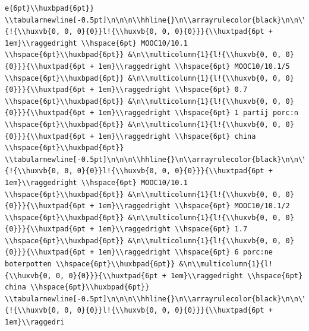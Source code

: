 \documentclass[11pt,preprint, authoryear]{elsarticle}
\numberwithin{equation}{section}
\numberwithin{figure}{section}
\numberwithin{table}{section}
\begin{document}
\begin{verbatim}
e{6pt}\\huxbpad{6pt}} \\tabularnewline[-0.5pt]\n\n\n\\hhline{}\n\\arrayrulecolor{black}\n\n\\multicolumn{1}{!{\\huxvb{0, 0, 0}{0}}l!{\\huxvb{0, 0, 0}{0}}}{\\huxtpad{6pt + 1em}\\raggedright \\hspace{6pt} MOOC10/10.1 \\hspace{6pt}\\huxbpad{6pt}} &\n\\multicolumn{1}{l!{\\huxvb{0, 0, 0}{0}}}{\\huxtpad{6pt + 1em}\\raggedright \\hspace{6pt} MOOC10/10.1/5 \\hspace{6pt}\\huxbpad{6pt}} &\n\\multicolumn{1}{l!{\\huxvb{0, 0, 0}{0}}}{\\huxtpad{6pt + 1em}\\raggedright \\hspace{6pt} 0.7 \\hspace{6pt}\\huxbpad{6pt}} &\n\\multicolumn{1}{l!{\\huxvb{0, 0, 0}{0}}}{\\huxtpad{6pt + 1em}\\raggedright \\hspace{6pt} 1 partij porc:n \\hspace{6pt}\\huxbpad{6pt}} &\n\\multicolumn{1}{l!{\\huxvb{0, 0, 0}{0}}}{\\huxtpad{6pt + 1em}\\raggedright \\hspace{6pt} china \\hspace{6pt}\\huxbpad{6pt}} \\tabularnewline[-0.5pt]\n\n\n\\hhline{}\n\\arrayrulecolor{black}\n\n\\multicolumn{1}{!{\\huxvb{0, 0, 0}{0}}l!{\\huxvb{0, 0, 0}{0}}}{\\huxtpad{6pt + 1em}\\raggedright \\hspace{6pt} MOOC10/10.1 \\hspace{6pt}\\huxbpad{6pt}} &\n\\multicolumn{1}{l!{\\huxvb{0, 0, 0}{0}}}{\\huxtpad{6pt + 1em}\\raggedright \\hspace{6pt} MOOC10/10.1/2 \\hspace{6pt}\\huxbpad{6pt}} &\n\\multicolumn{1}{l!{\\huxvb{0, 0, 0}{0}}}{\\huxtpad{6pt + 1em}\\raggedright \\hspace{6pt} 1.7 \\hspace{6pt}\\huxbpad{6pt}} &\n\\multicolumn{1}{l!{\\huxvb{0, 0, 0}{0}}}{\\huxtpad{6pt + 1em}\\raggedright \\hspace{6pt} 6 porc:ne boterpotten \\hspace{6pt}\\huxbpad{6pt}} &\n\\multicolumn{1}{l!{\\huxvb{0, 0, 0}{0}}}{\\huxtpad{6pt + 1em}\\raggedright \\hspace{6pt} china \\hspace{6pt}\\huxbpad{6pt}} \\tabularnewline[-0.5pt]\n\n\n\\hhline{}\n\\arrayrulecolor{black}\n\n\\multicolumn{1}{!{\\huxvb{0, 0, 0}{0}}l!{\\huxvb{0, 0, 0}{0}}}{\\huxtpad{6pt + 1em}\\raggedri
\end{verbatim}
\end{document}
